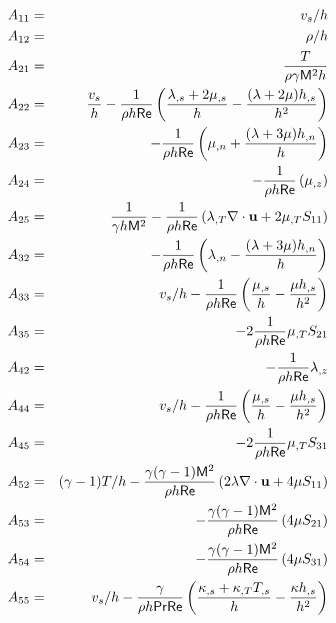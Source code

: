\pagebreak
{}
%
\begin{eqnarray} 
  A_{11} &=& \vs / h \\
  A_{12} &=& \rho / h \\
%
  A_{21} &=& \frac{ T}{\rho \gamma \M^2 h} \\
  A_{22} &=& \frac{\vs}{h} - 
             \facth\left( \frac{\lambda_{,s} + 2 \mu_{,s}}{h} - 
             \frac{(\lambda + 2\mu)\hs}{h^2} \right) \\
  A_{23} &=& -\facth\left( \mu_{,n} + 
             \frac{(\lambda + 3\mu)\hn}{h} \right) \\
  A_{24} &=& -\facth\left( \mu_{,z} \right) \\
  A_{25} &=& \frac{1}{\gamma h \M^2} - \facth \left( \dlm \divu + 
             2 \dmu S_{11} \right) \\
%
  A_{32} &=& -\facth \left( \lambda_{,n} - 
                           \frac{(\lambda + 3\mu)\hn}{h} \right) \\
  A_{33} &=& \vs / h - \facth\left( \frac{\mu_{,s}}{h} - 
                                   \frac{\mu\hs}{h^2} \right) \\
  A_{35} &=& -2\facth\dmu S_{21} \\
%
  A_{42} &=& -\facth\lambda_{,z} \\
  A_{44} &=&  \vs / h - \facth\left( \frac{\mu_{,s}}{h} - 
                                     \frac{\mu\hs}{h^2} \right) \\
  A_{45} &=& -2\facth\dmu S_{31} \\
%
  A_{52} &=& \gammam T / h - \ffh\left(2\lambda\divu + 
                                      4\mu S_{11}\right) \\
  A_{53} &=& -\ffh\left(4\mu S_{21}\right) \\
  A_{54} &=& -\ffh\left(4\mu S_{31}\right) \\
  A_{55} &=& \vs / h - 
             \frac{\gamma}{\rho h \Pr\Re}\left( \frac{\kappa_{,s} + 
             \dcon T_{,s}}{h} - \frac{\kappa\hs}{h^2} \right)
\end{eqnarray}

